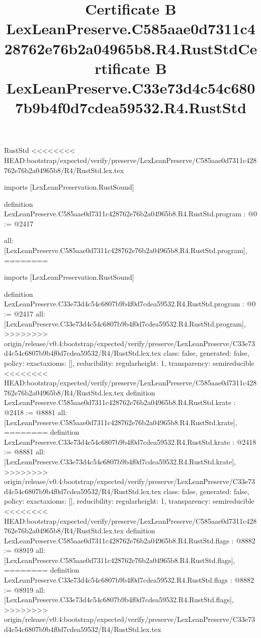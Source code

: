 \begin{lexlean}{RustStd}
<<<<<<<< HEAD:bootstrap/expected/verify/preserve/LexLeanPreserve/C585aae0d7311c428762e76b2a04965b8/R4/RustStd.lex.tex
\title{Certificate B LexLeanPreserve.C585aae0d7311c428762e76b2a04965b8.R4.RustStd}
\begin{coremodule}
imports [LexLeanPreservation.RustSound]

definition LexLeanPreserve.C585aae0d7311c428762e76b2a04965b8.R4.RustStd.program : @0 := @2417 {
  all: [LexLeanPreserve.C585aae0d7311c428762e76b2a04965b8.R4.RustStd.program],
========
\title{Certificate B LexLeanPreserve.C33e73d4c54c6807b9b4f0d7cdea59532.R4.RustStd}
\begin{coremodule}
imports [LexLeanPreservation.RustSound]

definition LexLeanPreserve.C33e73d4c54c6807b9b4f0d7cdea59532.R4.RustStd.program : @0 := @2417 {
  all: [LexLeanPreserve.C33e73d4c54c6807b9b4f0d7cdea59532.R4.RustStd.program],
>>>>>>>> origin/release/v0.4:bootstrap/expected/verify/preserve/LexLeanPreserve/C33e73d4c54c6807b9b4f0d7cdea59532/R4/RustStd.lex.tex
  class: false,
  generated: false,
  policy: exact{axioms: []},
  reducibility: regular{height: 1},
  transparency: semireducible
}
<<<<<<<< HEAD:bootstrap/expected/verify/preserve/LexLeanPreserve/C585aae0d7311c428762e76b2a04965b8/R4/RustStd.lex.tex
definition LexLeanPreserve.C585aae0d7311c428762e76b2a04965b8.R4.RustStd.krate : @2418 := @8881 {
  all: [LexLeanPreserve.C585aae0d7311c428762e76b2a04965b8.R4.RustStd.krate],
========
definition LexLeanPreserve.C33e73d4c54c6807b9b4f0d7cdea59532.R4.RustStd.krate : @2418 := @8881 {
  all: [LexLeanPreserve.C33e73d4c54c6807b9b4f0d7cdea59532.R4.RustStd.krate],
>>>>>>>> origin/release/v0.4:bootstrap/expected/verify/preserve/LexLeanPreserve/C33e73d4c54c6807b9b4f0d7cdea59532/R4/RustStd.lex.tex
  class: false,
  generated: false,
  policy: exact{axioms: []},
  reducibility: regular{height: 1},
  transparency: semireducible
}
<<<<<<<< HEAD:bootstrap/expected/verify/preserve/LexLeanPreserve/C585aae0d7311c428762e76b2a04965b8/R4/RustStd.lex.tex
definition LexLeanPreserve.C585aae0d7311c428762e76b2a04965b8.R4.RustStd.flags : @8882 := @8919 {
  all: [LexLeanPreserve.C585aae0d7311c428762e76b2a04965b8.R4.RustStd.flags],
========
definition LexLeanPreserve.C33e73d4c54c6807b9b4f0d7cdea59532.R4.RustStd.flags : @8882 := @8919 {
  all: [LexLeanPreserve.C33e73d4c54c6807b9b4f0d7cdea59532.R4.RustStd.flags],
>>>>>>>> origin/release/v0.4:bootstrap/expected/verify/preserve/LexLeanPreserve/C33e73d4c54c6807b9b4f0d7cdea59532/R4/RustStd.lex.tex
}}}
\end{coremodule}}
\end{coremodule}
\end{lexlean}
